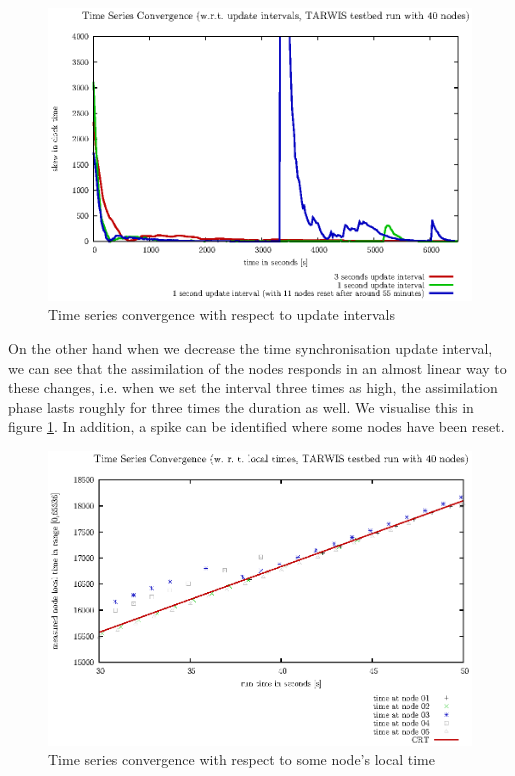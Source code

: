\documentclass{llncs}
\begin{document}
\begin{figure}[H]
\centering
\includegraphics[scale=0.6]{images/FIG_02.eps}
\caption{Time series convergence with respect to update intervals}
\label{fig:update_intervals}
\end{figure}
\noindent On the other hand when we decrease the time synchronisation update interval, we can see that the assimilation of the nodes responds in an almost linear way to these changes, i.e. when we set the interval three times as high, the assimilation phase lasts roughly for three times the duration as well. We visualise this in figure \ref{fig:update_intervals}. In addition, a spike can be identified where some nodes have been reset.\\

\begin{figure}[H]
\centering
\includegraphics[scale=0.6]{images/FIG_03.eps}
\caption{Time series convergence with respect to some node's local time}
\label{fig:local_time}
\end{figure}
\end{document}

